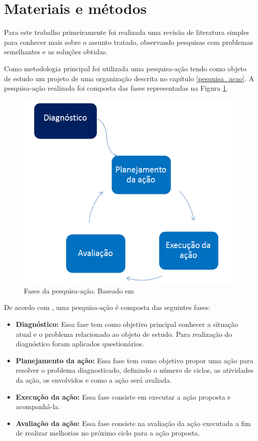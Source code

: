 \section{Materiais e métodos}

Para este trabalho primeiramente foi realizada uma revisão de literatura simples
para conhecer mais sobre o assunto tratado, observando pesquisas com problemas semelhantes e
as soluções obtidas.

Como metodologia principal foi utilizada uma pesquisa-ação tendo como objeto de estudo um projeto de uma organização descrita no capítulo \ref{pesquisa_acao}. A pesquisa-ação realizada foi composta das fases representadas na Figura \ref{fig:metodologia}.


\begin{figure}[!htb]
\centering
\includegraphics[scale=1]{figuras/pesquisaacao.png}
\caption{Fases da pesquisa-ação. Baseado em \cite{artigo_pesquisa_acao}}
\label{fig:metodologia}
\end{figure}

\pagebreak

De acordo com , uma pesquisa-ação é composta das seguintes fases:
	\begin{itemize}
		\item \textbf{Diagnóstico:} Essa fase tem como objetivo principal conhecer a situação atual e o problema relacionado ao objeto de estudo. Para realização do diagnóstico foram aplicados questionários.
		\item \textbf{Planejamento da ação:} Essa fase tem como objetivo propor uma ação para resolver o problema diagnosticado, definindo o número de ciclos, as atividades da ação, os envolvidos e como a ação será avaliada.
		\item \textbf{Execução da ação:} Essa fase consiste em executar a ação proposta e acompanhá-la.
		\item \textbf{Avaliação da ação:} Essa fase consiste na avaliação da ação executada a fim de realizar melhorias no próximo ciclo para a ação proposta.
	\end{itemize}

